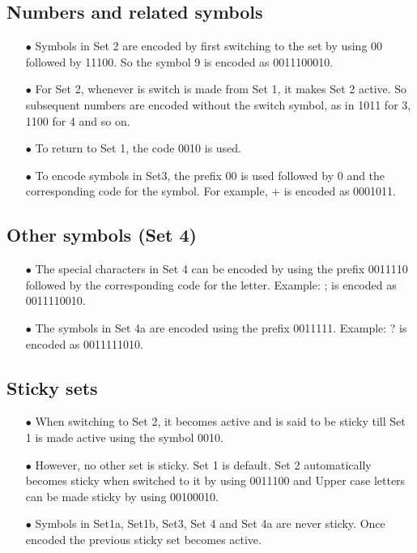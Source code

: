 \documentclass[]{article}
\begin{document}
\subsection{Numbers and related symbols}
\begin{itemize}
	\item[$\bullet$] Symbols in Set 2 are encoded by first switching to the set by using 00 followed by 11100.  So the symbol 9 is encoded as 0011100010.
	\item[$\bullet$] For Set 2, whenever is switch is made from Set 1, it makes Set 2 active. So subsequent numbers are encoded without the switch symbol, as in 1011 for 3, 1100 for 4 and so on.
	\item[$\bullet$] To return to Set 1, the code 0010 is used.
	\item[$\bullet$] To encode symbols in Set3, the prefix 00 is used followed by 0 and the corresponding code for the symbol.  For example, + is encoded as 0001011.
\end{itemize}

\subsection{Other symbols (Set 4)}
\begin{itemize}
	\item[$\bullet$] The special characters in Set 4 can be encoded by using the prefix 0011110 followed by the corresponding code for the letter.  Example: ; is encoded as 0011110010.
	\item[$\bullet$] The symbols in Set 4a are encoded using the prefix 0011111. Example: ? is encoded as 0011111010.
\end{itemize}

\subsection{Sticky sets}
\begin{itemize}
	\item[$\bullet$] When switching to Set 2, it becomes active and is said to be sticky till Set 1 is made active using the symbol 0010.
	\item[$\bullet$] However, no other set is sticky. Set 1 is default. Set 2 automatically becomes sticky when switched to it by using 0011100 and Upper case letters can be made sticky by using 00100010.
    \item[$\bullet$] Symbols in Set1a, Set1b, Set3, Set 4 and Set 4a are never sticky. Once encoded the previous sticky set becomes active.
\end{itemize}
\end{document}
